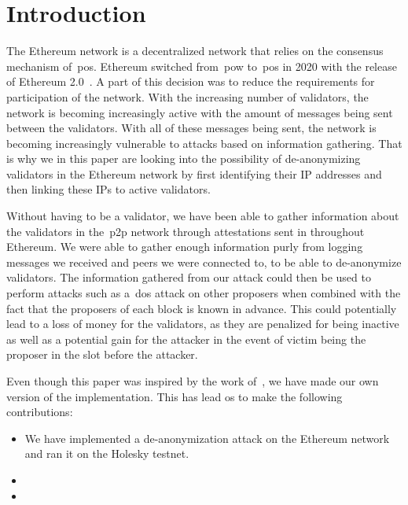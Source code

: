 

\section{Introduction}\label{sec:introduction}
The Ethereum network is a decentralized network that relies on the consensus mechanism of~\gls{pos}.
Ethereum switched from~\gls{pow} to~\gls{pos} in 2020 with the release of Ethereum 2.0~\cite{EthereumProof-of-stakePoS}.
A part of this decision was to reduce the requirements for participation of the network.
With the increasing number of validators, the network is becoming increasingly active with the amount of messages being sent between the validators.
With all of these messages being sent, the network is becoming increasingly vulnerable to attacks based on information gathering.
That is why we in this paper are looking into the possibility of de-anonymizing validators in the Ethereum network by first identifying their IP addresses and then linking these IPs to active validators.


Without having to be a validator, we have been able to gather information about the validators in the~\gls{p2p} network through attestations sent in throughout Ethereum.
We were able to gather enough information purly from logging messages we received and peers we were connected to, to be able to de-anonymize validators.
The information gathered from our attack could then be used to perform attacks such as a~\gls{dos} attack on other proposers when combined with the fact that the proposers of each block is known in advance.
This could potentially lead to a loss of money for the validators, as they are penalized for being inactive as well as a potential gain for the attacker in the event of victim being the proposer in the slot before the attacker.

Even though this paper was inspired by the work of~\cite{de-anon paper}, we have made our own version of the implementation.
This has lead os to make the following contributions:
\begin{itemize}
    \item We have implemented a de-anonymization attack on the Ethereum network and ran it on the Holesky testnet.
    \item
    \item
\end{itemize}
\



